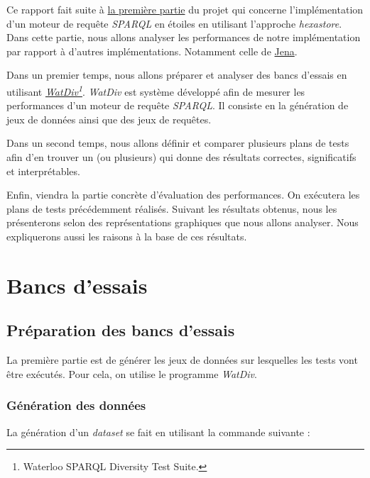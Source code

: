 \documentclass[12pt,titlepage]{article}
\begin{document}
Ce rapport fait suite à \href{https://github.com/chakibreds/mtq\_moteur\_sparql}{la première partie} du projet qui concerne l'implémentation d'un moteur de requête \textit{SPARQL} en étoiles en utilisant l'approche \textit{hexastore}. Dans cette partie, nous allons analyser les performances de notre implémentation par rapport à d'autres implémentations. Notamment celle de \href{https://fr.wikipedia.org/wiki/Jena\_(framework)}{Jena}.



Dans un premier temps, nous allons préparer et analyser des bancs d'essais en utilisant \textit{\href{https://dsg.uwaterloo.ca/watdiv/}{WatDiv}\footnote{Waterloo SPARQL Diversity Test Suite.}}. \textit{WatDiv} est système développé afin de mesurer les performances d'un moteur de requête \textit{SPARQL}. Il consiste en la génération de jeux de données ainsi que des jeux de requêtes.



Dans un second temps, nous allons définir et comparer plusieurs plans de tests afin d'en trouver un (ou plusieurs) qui donne des résultats correctes, significatifs et interprétables.



Enfin, viendra la partie concrète d'évaluation des performances. On exécutera les plans de tests précédemment réalisés. Suivant les résultats obtenus, nous les présenterons selon des représentations graphiques que nous allons analyser. Nous expliquerons aussi les raisons à la base de ces résultats.




\section{Bancs d'essais}

\subsection{Préparation des bancs d'essais}

La première partie est de générer les jeux de données sur lesquelles les tests vont être exécutés. Pour cela, on utilise le programme \textit{WatDiv}.

\subsubsection{Génération des données}

La génération d'un \textit{dataset} se fait en utilisant la commande suivante :
\end{document}
